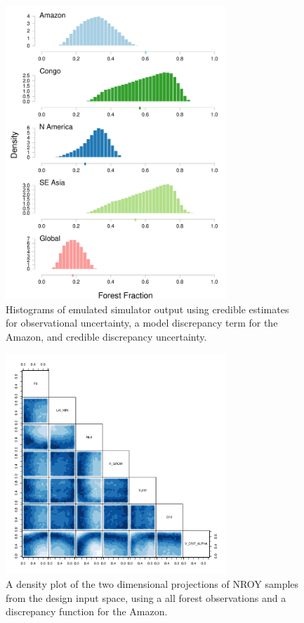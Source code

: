 \documentclass[esd, article]{copernicus} %
\providecommand{\DIFaddbeginFL}{} %
\providecommand{\DIFaddendFL}{} %
\providecommand{\DIFdelbeginFL}{} %
\providecommand{\DIFdelendFL}{} %
\begin{document}
\begin{figure}[t]
\DIFdelbeginFL %
\DIFdelendFL \DIFaddbeginFL \includegraphics[width=8.3cm]{graphics/credible_NROY_hists_disc.pdf}
\DIFaddendFL \caption{Histograms of emulated simulator output using credible estimates for observational uncertainty, a model discrepancy term for the Amazon, and credible discrepancy uncertainty.}
\label{fig:credible_NROY_hists_disc}
\end{figure}

\begin{figure}[t]
\DIFdelbeginFL %
\DIFdelendFL \DIFaddbeginFL \includegraphics[width=8.3cm]{graphics/plausible_disc_input_space.pdf}
\DIFaddendFL \caption{A density plot of the two dimensional projections of NROY samples from the design input space, using a all forest observations and a discrepancy function for the Amazon.}
\label{fig:plausible_disc_input_space}
\end{figure}
\end{document}
